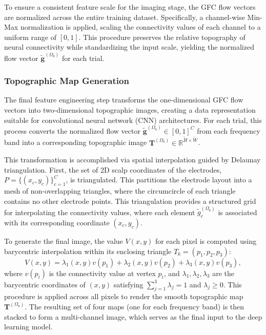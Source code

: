 To ensure a consistent feature scale for the imaging stage, the GFC flow vectors are normalized across the entire training dataset. Specifically, a channel-wise Min-Max normalization is applied, scaling the connectivity values of each channel to a uniform range of $[0, 1]$. This procedure preserves the relative topography of neural connectivity while standardizing the input scale, yielding the normalized flow vector $\tilde{\mathbf{g}}^{(\Omega_b)}$ for each trial.

\subsubsection{Topographic Map Generation}

The final feature engineering step transforms the one-dimensional GFC flow vectors into two-dimensional topographic images, creating a data representation suitable for convolutional neural network (CNN) architectures. For each trial, this process converts the normalized flow vector $\tilde{\mathbf{g}}^{(\Omega_b)} \in [0, 1]^C$ from each frequency band into a corresponding topographic image $\mathbf{T}^{(\Omega_b)} \in \mathbb{R}^{\tilde{H} \times \tilde{W}}$.

This transformation is accomplished via spatial interpolation guided by Delaunay triangulation. First, the set of 2D scalp coordinates of the electrodes, $P = \{(x_c, y_c)\}_{c=1}^C$, is triangulated. This partitions the electrode layout into a mesh of non-overlapping triangles, where the circumcircle of each triangle contains no other electrode points. This triangulation provides a structured grid for interpolating the connectivity values, where each element $\tilde{g}_c^{(\Omega_b)}$ is associated with its corresponding coordinate $(x_c, y_c)$.

To generate the final image, the value $V(x, y)$ for each pixel is computed using barycentric interpolation within its enclosing triangle $T_k = (p_1, p_2, p_3)$:
%
\begin{equation}
    V(x, y) = \lambda_1(x, y) v(p_1) + \lambda_2(x, y) v(p_2) + \lambda_3(x, y) v(p_3),
    \label{eq:barycentric_interpolation}
\end{equation}
%
where $v(p_i)$ is the connectivity value at vertex $p_i$, and $\lambda_1, \lambda_2, \lambda_3$ are the barycentric coordinates of $(x, y)$ satisfying $\sum_{j=1}^{3} \lambda_j = 1$ and $\lambda_j \geq 0$. This procedure is applied across all pixels to render the smooth topographic map $\mathbf{T}^{(\Omega_b)}$. The resulting set of four maps (one for each frequency band) is then stacked to form a multi-channel image, which serves as the final input to the deep learning model.


